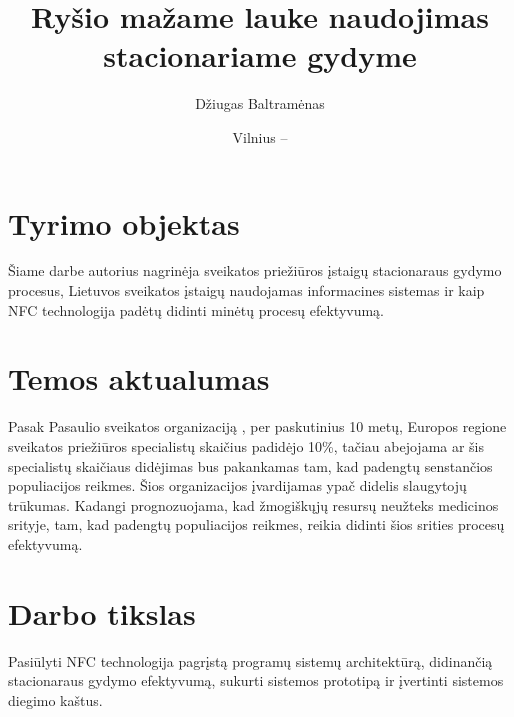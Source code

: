 \documentclass{VUMIFPSbakalaurinis}
\title{Ryšio mažame lauke naudojimas stacionariame gydyme}
\author{Džiugas Baltramėnas}
\date{Vilnius – \the\year}
\begin{document}
\maketitle

\tableofcontents

\section{Tyrimo objektas}
Šiame darbe autorius nagrinėja sveikatos priežiūros įstaigų stacionaraus gydymo procesus, Lietuvos sveikatos įstaigų naudojamas informacines sistemas ir kaip NFC technologija padėtų didinti minėtų procesų efektyvumą.


\section{Temos aktualumas}
Pasak Pasaulio sveikatos organizaciją \cite{Organization2012}, per paskutinius 10 metų, Europos regione sveikatos priežiūros specialistų skaičius padidėjo 10\%, tačiau abejojama ar šis specialistų skaičiaus didėjimas bus pakankamas tam, kad padengtų senstančios populiacijos reikmes. Šios organizacijos įvardijamas ypač didelis slaugytojų trūkumas. Kadangi prognozuojama, kad žmogiškųjų resursų neužteks medicinos srityje, tam, kad padengtų populiacijos reikmes, reikia didinti šios srities procesų efektyvumą.

\section{Darbo tikslas}
Pasiūlyti NFC technologija pagrįstą programų sistemų architektūrą, didinančią stacionaraus gydymo efektyvumą, sukurti sistemos prototipą ir įvertinti sistemos diegimo kaštus.
    
\end{document}
